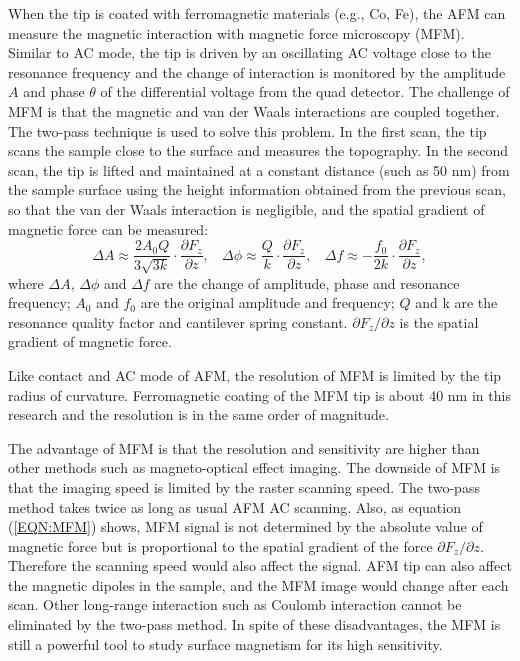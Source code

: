 \documentclass[pdflatex, sectionletters, 12pt, final, phd]{pittetd}    %
\begin{document}
When the tip is coated with ferromagnetic materials (e.g., Co, Fe), the AFM can measure the magnetic interaction with magnetic force microscopy (MFM). Similar to AC mode, the tip is driven by an oscillating AC voltage close to the resonance frequency and the change of interaction is monitored by the amplitude $A$ and phase $\theta$ of the differential voltage from the quad detector. The challenge of MFM is that the magnetic and van der Waals interactions are coupled together. The two-pass technique is used to solve this problem. In the first scan, the tip scans the sample close to the surface and measures the topography. In the second scan, the tip is lifted and maintained at a constant distance (such as 50 nm) from the sample surface using the height information obtained from the previous scan, so that the van der Waals interaction is negligible, and the spatial gradient of magnetic force can be measured\cite{hartmann1999magnetic}:
\begin{equation}
\label{EQN:MFM}
\Delta A \approx \frac{2 A_0 Q}{3\sqrt{3k}} \cdot \frac{\partial F_z}{\partial z}, \ \ \ \
\Delta \phi \approx \frac{Q}{k} \cdot \frac{\partial F_z}{\partial z}, \ \ \ \
\Delta f \approx -\frac{f_0}{2k} \cdot \frac{\partial F_z}{\partial z}, 
\end{equation}
where $\Delta A$, $\Delta \phi$ and $\Delta f$ are the change of amplitude, phase and resonance frequency; $A_0$ and $f_0$ are the original amplitude and frequency; $Q$ and k are the resonance quality factor and cantilever spring constant. $\partial F_z/\partial z$ is the spatial gradient of magnetic force. 

Like contact and AC mode of AFM, the resolution of MFM is limited by the tip radius of curvature. Ferromagnetic coating of the MFM tip is about 40 nm in this research and the resolution is in the same order of magnitude. 

The advantage of MFM is that the resolution and sensitivity are higher than other methods such as magneto-optical effect imaging. The downside of MFM is that the imaging speed is limited by the raster scanning speed. The two-pass method takes twice as long as usual AFM AC scanning. Also, as equation (\ref{EQN:MFM}) shows, MFM signal is not determined by the absolute value of magnetic force but is proportional to the spatial gradient of the force $\partial F_z/\partial z$. Therefore the scanning speed would also affect the signal. AFM tip can also affect the magnetic dipoles in the sample, and the MFM image would change after each scan. Other long-range interaction such as Coulomb interaction cannot be eliminated by the two-pass method. In spite of these disadvantages, the MFM is still a powerful tool to study surface magnetism for its high sensitivity.
\end{document}
